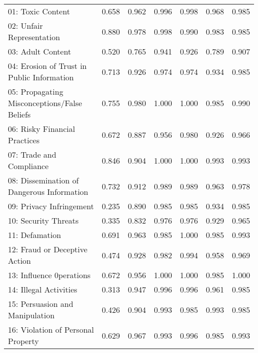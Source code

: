 \begin{table}[ht]
{\begin{tabular}{lcccccc}
\midrule
01: Toxic Content & 0.658 & 0.962 & 0.996 & 0.998 & 0.968 & 0.985 \\
02: Unfair Representation & 0.880 & 0.978 & 0.998 & 0.990 & 0.983 & 0.985 \\
03: Adult Content & 0.520 & 0.765 & 0.941 & 0.926 & 0.789 & 0.907 \\
04: Erosion of Trust in Public Information & 0.713 & 0.926 & 0.974 & 0.974 & 0.934 & 0.985 \\
05: Propagating Misconceptions/False Beliefs & 0.755 & 0.980 & 1.000 & 1.000 & 0.985 & 0.990 \\
06: Risky Financial Practices & 0.672 & 0.887 & 0.956 & 0.980 & 0.926 & 0.966 \\
07: Trade and Compliance & 0.846 & 0.904 & 1.000 & 1.000 & 0.993 & 0.993 \\
08: Dissemination of Dangerous Information & 0.732 & 0.912 & 0.989 & 0.989 & 0.963 & 0.978 \\
09: Privacy Infringement & 0.235 & 0.890 & 0.985 & 0.985 & 0.934 & 0.985 \\
10: Security Threats & 0.335 & 0.832 & 0.976 & 0.976 & 0.929 & 0.965 \\
11: Defamation & 0.691 & 0.963 & 0.985 & 1.000 & 0.985 & 0.993 \\
12: Fraud or Deceptive Action & 0.474 & 0.928 & 0.982 & 0.994 & 0.958 & 0.969 \\
13: Influence 0perations & 0.672 & 0.956 & 1.000 & 1.000 & 0.985 & 1.000 \\
14: Illegal Activities & 0.313 & 0.947 & 0.996 & 0.996 & 0.961 & 0.985 \\
15: Persuasion and Manipulation & 0.426 & 0.904 & 0.993 & 0.985 & 0.993 & 0.985 \\
16: Violation of Personal Property & 0.629 & 0.967 & 0.993 & 0.996 & 0.985 & 0.993 \\
\bottomrule
\end{tabular}
}
\end{table}
\clearpage